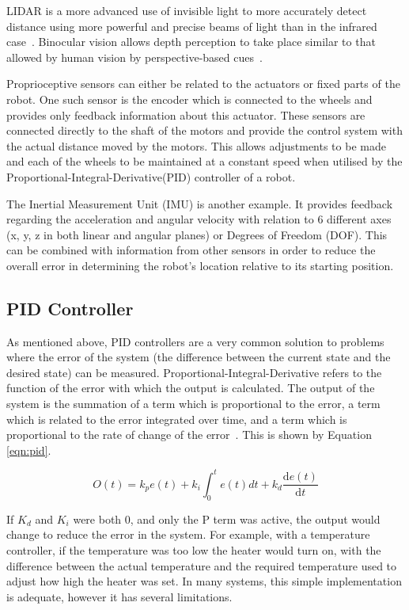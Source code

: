 LIDAR is a more advanced use of invisible light to more accurately detect 
distance using more powerful and precise beams of light than in the infrared 
case~\cite{lidar}. Binocular vision allows depth perception to take place 
similar to that allowed by human vision by perspective-based cues~\cite{read2005early, pfautz2002depth}. 

Proprioceptive sensors can either be related to the actuators or fixed parts of the 
robot. One such sensor is the encoder which is connected to the wheels and provides 
only feedback information about this actuator. These sensors are connected 
directly to the shaft of the motors and provide the control system with the 
actual distance moved by the motors. This allows adjustments to be made and each 
of the wheels to be maintained at a constant speed when utilised by the 
Proportional-Integral-Derivative(PID) controller of a robot. 


The Inertial Measurement Unit (IMU) is another example. It provides feedback regarding the acceleration and angular 
velocity with relation to 6 different axes (x, y, z in both linear and angular 
planes) or Degrees of Freedom (DOF). This can be combined with information from 
other sensors in order to reduce the overall error in determining the robot's 
location relative to its starting position.  

\subsection{PID Controller}\label{litreview/robotics/pid}
As mentioned above, PID controllers are a very common solution to problems where the error of the
system (the difference between the current state and the desired state) can be
measured. Proportional-Integral-Derivative refers to the
function of the error with which the output is calculated. The output of the
system is the summation of a term which is proportional to the error, a term
which is related to the error integrated over time, and a term which is
proportional to the rate of change of the error~\cite{aastrom2006advanced}. This is shown by Equation \ref{eqn:pid}.

\begin{equation}
\label{eqn:pid}
O(t) = k_{p}e(t) + k_i\int_{0}^{t}e(t)dt + k_d \frac{\mathrm{d} e(t) }{\mathrm{d} t}
\end{equation}

If $K_d$ and $K_i$ were both 0, and only the P term was active, the output
would change to reduce the error in the system. For example, with a
temperature controller, if the temperature was too low the heater would
turn on, with the difference between the actual temperature and the required
temperature used to adjust how high the heater was set. In many systems, this simple
implementation is adequate, however it has several limitations.

